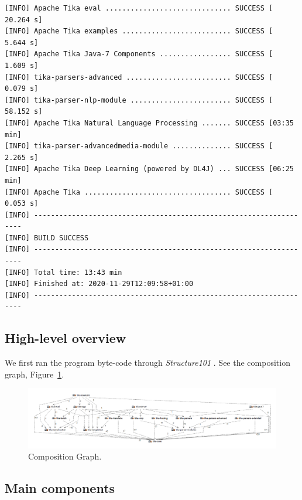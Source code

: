 \documentclass{article}
\begin{document}
\begin{lstlisting}[caption={Terminal output after successfully compiling Apache Tika.}, label={code:compilation-output},language={CompilationStep}]
[INFO] Apache Tika eval .............................. SUCCESS [ 20.264 s]
[INFO] Apache Tika examples .......................... SUCCESS [  5.644 s]
[INFO] Apache Tika Java-7 Components ................. SUCCESS [  1.609 s]
[INFO] tika-parsers-advanced ......................... SUCCESS [  0.079 s]
[INFO] tika-parser-nlp-module ........................ SUCCESS [ 58.152 s]
[INFO] Apache Tika Natural Language Processing ....... SUCCESS [03:35 min]
[INFO] tika-parser-advancedmedia-module .............. SUCCESS [  2.265 s]
[INFO] Apache Tika Deep Learning (powered by DL4J) ... SUCCESS [06:25 min]
[INFO] Apache Tika ................................... SUCCESS [  0.053 s]
[INFO] -------------------------------------------------------------------
[INFO] BUILD SUCCESS
[INFO] -------------------------------------------------------------------
[INFO] Total time: 13:43 min
[INFO] Finished at: 2020-11-29T12:09:58+01:00
[INFO] -------------------------------------------------------------------
\end{lstlisting}

\subsection{High-level overview}
We first ran the program byte-code through \textit{Structure101} \citep{chedgeystructure101}. See the composition graph, Figure~\ref{fig:composition}.

\newpage
{}
\begin{figure}[ht]
    \centering
    \includegraphics[width=1\textwidth]{report/images/tika.png}
    \caption{Composition Graph.}
    \label{fig:composition}
    
\end{figure}
\restoregeometry
\pagebreak

\subsection{Main components}
\end{document}
